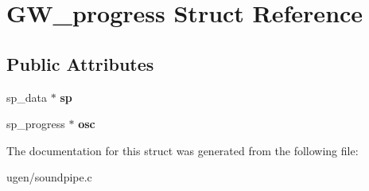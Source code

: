 \hypertarget{structGW__progress}{}\section{G\+W\+\_\+progress Struct Reference}
\label{structGW__progress}
\subsection*{Public Attributes}
\begin{DoxyCompactItemize}
\item 
\hypertarget{structGW__progress_a0080cfa5a54cd598848577a370d91363}{}\label{structGW__progress_a0080cfa5a54cd598848577a370d91363} 
sp\+\_\+data $\ast$ {\bfseries sp}
\item 
\hypertarget{structGW__progress_a179ead2e9512ba2053744427b72dadff}{}\label{structGW__progress_a179ead2e9512ba2053744427b72dadff} 
sp\+\_\+progress $\ast$ {\bfseries osc}
\end{DoxyCompactItemize}


The documentation for this struct was generated from the following file\+:\begin{DoxyCompactItemize}
\item 
ugen/soundpipe.\+c\end{DoxyCompactItemize}
